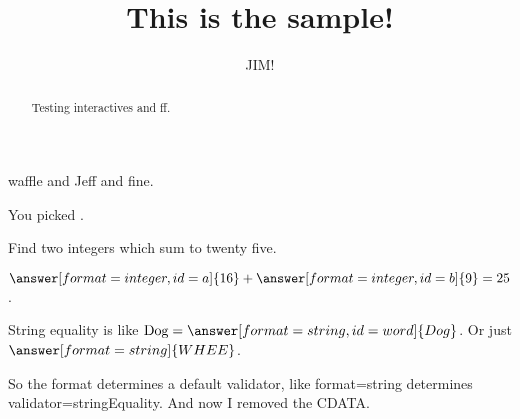 \documentclass{ximera}
\title{This is the sample!}
\author{JIM!}
\begin{document}
\begin{abstract}
Testing interactives and ff.
\end{abstract}
\maketitle

waffle and Jeff and fine.


\begin{problem}
  \begin{multipleChoice}
  \end{multipleChoice}

  \begin{multipleChoice}[id=mc]
  \end{multipleChoice}

  You picked .

  \begin{multipleChoice}
  \end{multipleChoice}

  \begin{multipleChoice}[id=tf]
  \end{multipleChoice}
\end{problem}

\begin{problem}
  Find two integers which sum to twenty five.

  \begin{validator}[a+b==25]
    $\answer[format=integer,id=a]{16} + \answer[format=integer,id=b]{9} = 25$.
  \end{validator}
\end{problem}

\begin{problem}
  String equality is like $\mbox{Dog} = \answer[format=string,id=word]{Dog}$.  Or just $\answer[format=string]{WHEE}$.

  So the format determines a default validator, like format=string determines validator=stringEquality.  And now I removed the CDATA.
\end{problem}
\end{document}
